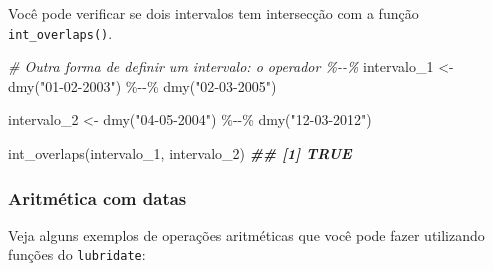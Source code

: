 \documentclass[
]{book}
\newenvironment{Shaded}{\begin{snugshade}}{\end{snugshade}}
\newcommand{\CommentTok}[1]{\textcolor[rgb]{0.56,0.35,0.01}{\textit{#1}}}
\newcommand{\DocumentationTok}[1]{\textcolor[rgb]{0.56,0.35,0.01}{\textbf{\textit{#1}}}}
\newcommand{\FunctionTok}[1]{\textcolor[rgb]{0.00,0.00,0.00}{#1}}
\newcommand{\NormalTok}[1]{#1}
\newcommand{\OtherTok}[1]{\textcolor[rgb]{0.56,0.35,0.01}{#1}}
\newcommand{\SpecialCharTok}[1]{\textcolor[rgb]{0.00,0.00,0.00}{#1}}
\newcommand{\StringTok}[1]{\textcolor[rgb]{0.31,0.60,0.02}{#1}}
\begin{document}
Você pode verificar se dois intervalos tem intersecção com a função \texttt{int\_overlaps()}.

\begin{Shaded}
\begin{Highlighting}[]
\CommentTok{\# Outra forma de definir um intervalo: o operador \%{-}{-}\%}
\NormalTok{intervalo\_1 }\OtherTok{\textless{}{-}} \FunctionTok{dmy}\NormalTok{(}\StringTok{"01{-}02{-}2003"}\NormalTok{) }\SpecialCharTok{\%{-}{-}\%} \FunctionTok{dmy}\NormalTok{(}\StringTok{"02{-}03{-}2005"}\NormalTok{)  }

\NormalTok{intervalo\_2 }\OtherTok{\textless{}{-}} \FunctionTok{dmy}\NormalTok{(}\StringTok{"04{-}05{-}2004"}\NormalTok{) }\SpecialCharTok{\%{-}{-}\%} \FunctionTok{dmy}\NormalTok{(}\StringTok{"12{-}03{-}2012"}\NormalTok{)  }

\FunctionTok{int\_overlaps}\NormalTok{(intervalo\_1, intervalo\_2)}
\DocumentationTok{\#\# [1] TRUE}
\end{Highlighting}
\end{Shaded}

\hypertarget{aritmuxe9tica-com-datas}{%
\subsubsection{Aritmética com datas}\label{aritmuxe9tica-com-datas}}

Veja alguns exemplos de operações aritméticas que você pode fazer utilizando funções do \texttt{lubridate}:
\end{document}
